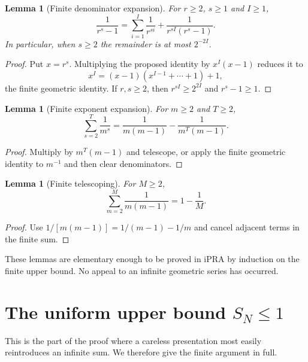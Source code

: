 \documentclass[11pt]{article}
\newtheorem{lemma}[theorem]{Lemma}
\theoremstyle{definition}
\begin{document}
\begin{lemma}[Finite denominator expansion]\label{lem:geom-den}
For $r\ge2$, $s\ge1$ and $I\ge1$,
\begin{equation}\label{eq:geom-den}
  \frac1{r^s-1}
  =\sum_{i=1}^{I}\frac1{r^{si}}
   +\frac1{r^{sI}(r^s-1)}.
\end{equation}
In particular, when $s\ge2$ the remainder is at most $2^{-2I}$.
\end{lemma}

\begin{proof}
Put $x=r^s$.  Multiplying the proposed identity by $x^I(x-1)$ reduces it to
\[
  x^I=(x-1)(x^{I-1}+\cdots+1)+1,
\]
the finite geometric identity.  If $r,s\ge2$, then $r^{sI}\ge2^{2I}$ and
$r^s-1\ge1$.
\end{proof}

\begin{lemma}[Finite exponent expansion]\label{lem:geom-exp}
For $m\ge2$ and $T\ge2$,
\begin{equation}\label{eq:geom-exp}
  \sum_{s=2}^{T}\frac1{m^s}
  =\frac1{m(m-1)}-\frac1{m^T(m-1)}.
\end{equation}
\end{lemma}

\begin{proof}
Multiply by $m^T(m-1)$ and telescope, or apply the finite geometric identity
to $m^{-1}$ and then clear denominators.
\end{proof}

\begin{lemma}[Finite telescoping]\label{lem:telescoping}
For $M\ge2$,
\begin{equation}\label{eq:telescoping}
  \sum_{m=2}^{M}\frac1{m(m-1)}=1-\frac1M.
\end{equation}
\end{lemma}

\begin{proof}
Use $1/[m(m-1)]=1/(m-1)-1/m$ and cancel adjacent terms in the finite sum.
\end{proof}

These lemmas are elementary enough to be proved in iPRA by induction on the
finite upper bound.  No appeal to an infinite geometric series has occurred.

\section{The uniform upper bound \texorpdfstring{$S_N\le1$}{S(N) <= 1}}

This is the part of the proof where a careless presentation most easily
reintroduces an infinite sum.  We therefore give the finite argument in full.
\end{document}
